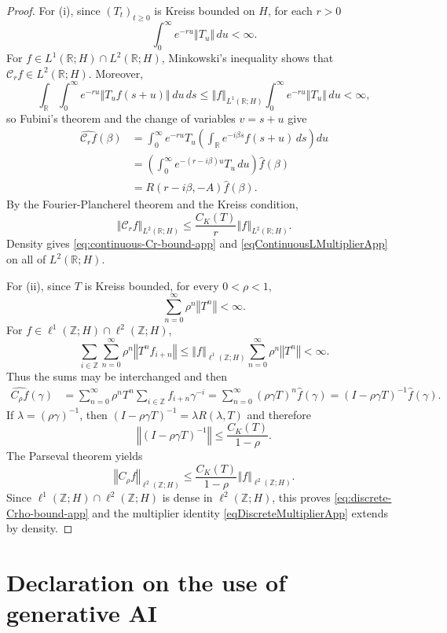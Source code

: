 \documentclass[12pt]{amsart}
\theoremstyle{plain}
\theoremstyle{remark}
\theoremstyle{definition}
\newcommand{\R}{\mathbb{R}}
\newcommand{\Z}{\mathbb{Z}}
\newcommand{\norm}[1]{\left\Vert #1\right\Vert}
\begin{document}
	
	\begin{proof}
		
		For (i), since $(T_t)_{t\ge0}$ is Kreiss bounded on $H$, for each $r>0$
		\[
		\int_0^\infty e^{-ru}\norm{T_u}\,du<\infty.
		\]
		For $f\in L^1(\R;H)\cap L^2(\R;H)$, Minkowski's inequality shows that $\mathcal C_rf\in L^2(\R;H)$. Moreover,
		\[
		\int_\R\int_0^\infty e^{-ru}\norm{T_uf(s+u)}\,du\,ds
		\le \norm{f}_{L^1(\R;H)}\int_0^\infty e^{-ru}\norm{T_u}\,du<\infty,
		\]
		so Fubini's theorem and the change of variables $v=s+u$ give
		\begin{align*}
			\widehat{\mathcal C_rf}(\beta)
			&=\int_0^\infty e^{-ru}T_u
			\left(\int_\R e^{-i\beta s}f(s+u)\,ds\right)du\\
			&=\left(\int_0^\infty e^{-(r-i\beta)u}T_u\,du\right)\widehat f(\beta)\\
			&=R(r-i\beta,-A)\widehat f(\beta).
		\end{align*}
		By the Fourier-Plancherel theorem and the Kreiss condition,
		\[
		\norm{\mathcal C_rf}_{L^2(\R;H)}
		\le \frac{C_K(T)}r\norm{f}_{L^2(\R;H)}.
		\]
		Density gives \eqref{eq:continuous-Cr-bound-app} and \eqref{eqContinuousLMultiplierApp} on all of $L^2(\R;H)$.
		
		\medskip
		
		For (ii), since $T$ is Kreiss bounded, for every $0<\rho <1$,
		\[
		\sum_{n=0}^\infty \rho^n\norm{T^n}<\infty.
		\]
		For $f\in \ell^1(\Z;H)\cap\ell^2(\Z;H)$,
		\[
		\sum_{i\in\Z}\sum_{n=0}^\infty \rho^n\norm{T^nf_{i+n}}
		\le \norm{f}_{\ell^1(\Z;H)}\sum_{n=0}^\infty \rho^n\norm{T^n}<\infty.
		\]
		Thus the sums may be interchanged and then
		\begin{align*}
			\widehat{C_\rho f}(\gamma)
			&=\sum_{n=0}^\infty \rho^nT^n
			\sum_{i\in\Z}f_{i+n}\gamma^{-i}=\sum_{n=0}^\infty(\rho\gamma T)^n\widehat f(\gamma)=(I-\rho\gamma T)^{-1}\widehat f(\gamma).
		\end{align*}
		If $\lambda=(\rho\gamma)^{-1}$, then
		$(I-\rho\gamma T)^{-1}=\lambda R(\lambda,T)$ and therefore
		\[
		\norm{(I-\rho\gamma T)^{-1}}
		\le \frac{C_K(T)}{1-\rho}.
		\]
		The Parseval theorem yields
		\[
		\norm{C_\rho f}_{\ell^2(\Z;H)}
		\le \frac{C_K(T)}{1-\rho}\norm{f}_{\ell^2(\Z;H)}.
		\]
		Since $\ell^1(\Z;H)\cap\ell^2(\Z;H)$ is dense in $\ell^2(\Z;H)$, this proves \eqref{eq:discrete-Crho-bound-app} and the multiplier identity \eqref{eqDiscreteMultiplierApp} extends by density.
	\end{proof}
	
	\section*{Declaration on the use of generative AI}
	
\end{document}
